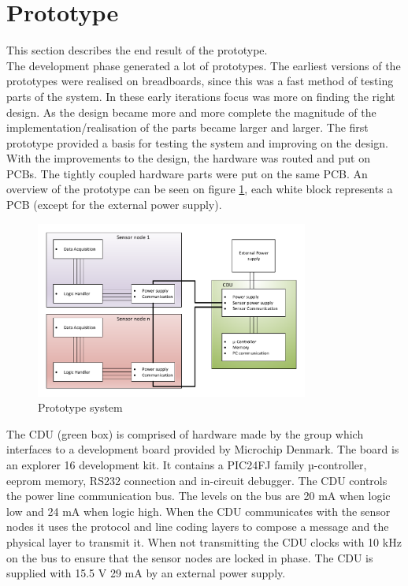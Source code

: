 \section{Prototype}
This section describes the end result of the prototype.\\
The development phase generated a lot of prototypes. The earliest versions of the prototypes were realised on breadboards, since this was a fast method of testing parts of the system. In these early iterations focus was more on finding the right design. As the design became more and more complete the magnitude of the implementation/realisation of the parts became larger and larger. The first prototype provided a basis for testing the system and improving on the design. With the improvements to the design, the hardware was routed and put on PCBs. The tightly coupled hardware parts were put on the same PCB. An overview of the prototype can be seen on figure \ref{fig:prototype}, each white block represents a PCB (except for the external power supply).
\begin{figure}[H]
	\centering
	\includegraphics[width=0.8\textwidth]{billeder/11ProjectDescription/prototypesystem}
	\caption{Prototype system}
	\label{fig:prototype}
\end{figure}
The CDU (green box) is comprised of hardware made by the group which interfaces to a development board provided by Microchip Denmark. The board is an explorer 16 development kit. It contains a PIC24FJ family µ-controller, eeprom memory, RS232 connection and in-circuit debugger. The CDU controls the power line communication bus. The levels on the bus are 20 mA when logic low and 24 mA when logic high. When the CDU communicates with the sensor nodes it uses the protocol and line coding layers to compose a message and the physical layer to transmit it. When not transmitting the CDU clocks with 10 kHz on the bus to ensure that the sensor nodes are locked in phase. The CDU is supplied with 15.5 V 29 mA by an external power supply. 

